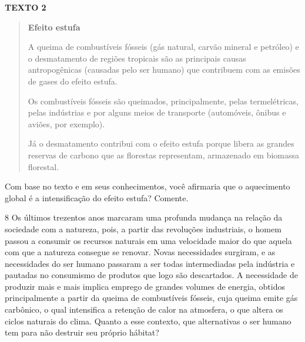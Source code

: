 \textbf{TEXTO 2}
\begin{quote}
\textbf{Efeito estufa}

A queima de combustíveis fósseis (gás natural, carvão mineral e petróleo) e o desmatamento de regiões tropicais são as principais causas antropogênicas (causadas pelo ser humano) que contribuem com as emisões de gases do efeito estufa.

Os combustíveis fósseis são queimados, principalmente, pelas termelétricas, pelas indústrias e por alguns meios de transporte (automóveis, ônibus e aviões, por exemplo).

Já o desmatamento contribui com o efeito estufa porque libera as grandes reservas de carbono que as florestas representam, armazenado em biomassa florestal.

\end{quote}

Com base no texto e em seus conhecimentos, você afirmaria que o aquecimento global é a intensificação do
efeito estufa? Comente.



\num{8} Os últimos trezentos anos marcaram uma profunda mudança na relação da
sociedade com a natureza, pois, a partir das revoluções
industriais, o homem passou a consumir os recursos naturais em uma
velocidade maior do que aquela com que a natureza consegue se renovar. 
Novas necessidades surgiram, e as necessidades do ser humano
passaram a ser todas intermediadas pela indústria e pautadas no
consumismo de produtos que logo são descartados. A necessidade de
produzir mais e mais implica emprego de grandes volumes de
energia, obtidos principalmente a partir da queima de
combustíveis fósseis, cuja queima emite gás carbônico, o qual intensifica a retenção de calor na atmosfera,
o que altera os ciclos naturais do clima.
Quanto a esse contexto, que alternativas o ser humano tem para não destruir seu próprio hábitat?

